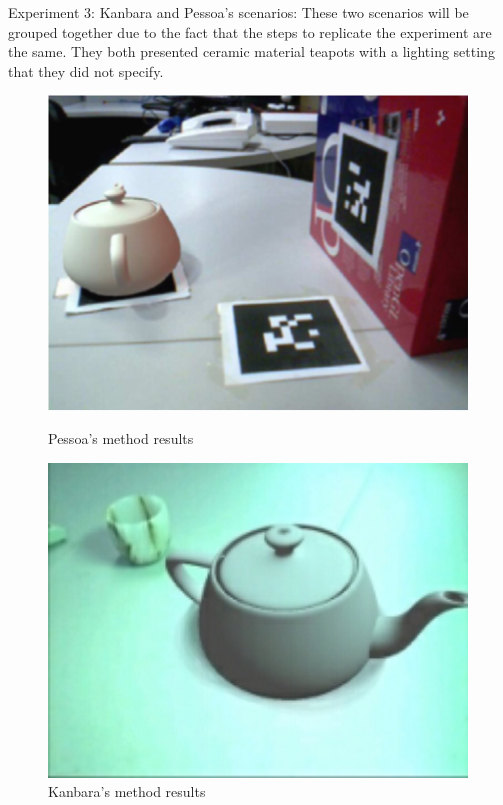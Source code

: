 Experiment 3: Kanbara and Pessoa's scenarios:  These two scenarios will be grouped together due to the fact that the steps to replicate the experiment are the same. They both presented ceramic material teapots with a lighting setting that they did not specify. 
\begin{figure}[H]
    \centering
    \begin{minipage}{0.475\textwidth}
        \centering
        \includegraphics[width=0.99\textwidth]{Figures/Pessoa.png} %
        \caption{Pessoa's method results}
    \end{minipage}\hfill
    \begin{minipage}{0.475\textwidth}
        \centering
        \includegraphics[width=0.99\textwidth]{Figures/kanbara.png} %
        \caption{Kanbara's method results}
    \end{minipage}\hfill
\end{figure}

